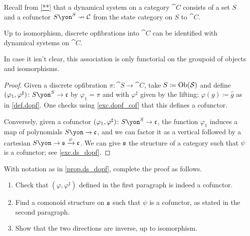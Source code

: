 \documentclass[DynamicalBook]{subfiles}
\begin{document}
Recall from \cref{**} that a dynamical system on a category $\cat{C}$ consists of a set $S$ and a cofunctor $S\yon^S\cof\cat{C}$ from the state category on $S$ to $\cat{C}$.

\begin{proposition}\label{prop.ds_dopf}
Up to isomorphism, discrete opfibrations into $\cat{C}$ can be identified with dynamical systems on $\cat{C}$.
\end{proposition}
In case it isn't clear, this association is only functorial on the groupoid of objects and isomorphisms.
\begin{proof}
Given a discrete opfibration $\pi\colon\cat{S}\to\cat{C}$, take $S\coloneqq\operatorname{Ob}(\mathcal{S})$ and define $(\varphi_1,\varphi^\sharp)\colon S\yon^S\to\ema{c}$ by $\varphi_1=\pi$ and with $\varphi^\sharp$ given by the lifting: $\varphi(g)\coloneqq \hat{g}$ as in \cref{def.dopf}. One checks using \cref{exc.dopf_cof} that this defines a cofunctor. 

Conversely, given a cofunctor $(\varphi_1,\varphi^\sharp)\colon S\yon^S\to\ema{c}$, the function $\varphi_1$ induces a map of polynomials $S\yon\to\ema{c}$, and we can factor it as a vertical followed by a cartesian $S\yon\to\ema{s}\To{\psi}\ema{c}$. We can give $\mathfrak{s}$ the structure of a category such that $\psi$ is a cofunctor; see \cref{exc.ds_dopf}.
\end{proof}

\begin{exercise}\label{exc.ds_dopf}
With notation as in \cref{prop.ds_dopf}, complete the proof as follows.
\begin{enumerate}
	\item Check that $(\varphi,\varphi^\sharp)$ defined in the first paragraph is indeed a cofunctor.
	\item Find a comonoid structure on $\mathfrak{s}$ such that $\psi$ is a cofunctor, as stated in the second paragraph. 
	\item Show that the two directions are inverse, up to isomorphism.
\qedhere
\end{enumerate}
\end{exercise}
\end{document}
